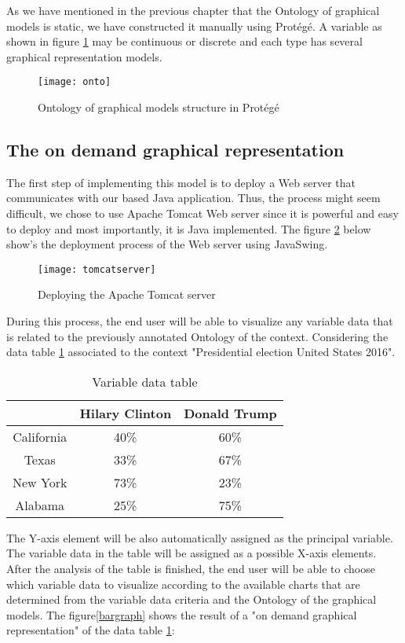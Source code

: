 As we have mentioned in the previous chapter that the Ontology of graphical models is static, we have constructed it manually using Protégé. A variable as shown in figure \ref{graph} may be continuous or discrete and each type has several graphical representation models. 

\begin{figure}[H]
\centering
\texttt{[image: onto]}
\caption{Ontology of graphical models structure in Protégé}
\label{graph}
\end{figure}

\subsection{The on demand graphical representation}
The first step of implementing this model is to deploy a Web server that communicates with our based Java application. Thus, the process might seem difficult, we chose to use Apache Tomcat Web server since it is powerful and easy to deploy and most importantly, it is Java implemented. The figure \ref{tomcat} below show's the deployment process of the Web server using JavaSwing.  

\begin{figure}[H]
\centering
\texttt{[image: tomcatserver]}
\caption{Deploying the Apache Tomcat server}
\label{tomcat}
\end{figure}

During this process, the end user will be able to visualize any variable data that is related to the previously annotated Ontology of the context. Considering the data table  \ref{datatable} associated to the context "Presidential election United States 2016".   
\begin{table}[H]
\centering
\caption{Variable data table}
\label{datatable}
\begin{tabular}{|c|c|c|}
\hline
           & Hilary Clinton & Donald Trump \\ \hline
California & 40\%           & 60\%         \\ \hline
Texas      & 33\%           & 67\%         \\ \hline
New York   & 73\%           & 23\%         \\ \hline
Alabama    & 25\%           & 75\%         \\ \hline
\end{tabular}
\end{table}

The Y-axis element will be also automatically assigned as the principal variable. The variable data in the table will be assigned as a possible X-axis elements. After the analysis of the table is finished, the end user will be able to choose which variable data to visualize according to the available charts that are determined from the variable data criteria and the Ontology of the graphical models. The figure\ref{bargraph} shows the result of a "on demand graphical representation" of the data table \ref{datatable}: 

